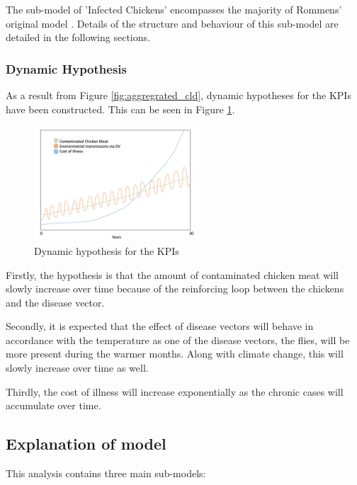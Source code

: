 The sub-model of 'Infected Chickens' encompasses the majority of Rommens' original model \parencite{rommens_infected_2020}. Details of the structure and behaviour of this sub-model are detailed in the following sections.

\subsubsection*{Dynamic Hypothesis}

As a result from Figure \ref{fig:aggregrated_cld}, dynamic hypotheses for the KPIs have been constructed. This can be seen in Figure \ref{fig:dynamic_hypothesis}. 

\begin{figure}[h]
\centering
\includegraphics[width=0.55\textwidth]{images/KPI_dynamic_hypo.png}
\caption{Dynamic hypothesis for the KPIs}
\label{fig:dynamic_hypothesis}
\end{figure}

Firstly, the hypothesis is that the amount of contaminated chicken meat will slowly increase over time because of the reinforcing loop between the chickens and the disease vector. 

Secondly, it is expected that the effect of disease vectors will behave in accordance with the temperature as one of the disease vectors, the flies, will be more present during the warmer months. Along with climate change, this will slowly increase over time as well. 

Thirdly, the cost of illness will increase exponentially as the chronic cases will accumulate over time. 


\subsection{Explanation of model}
   
This analysis contains three main sub-models:

